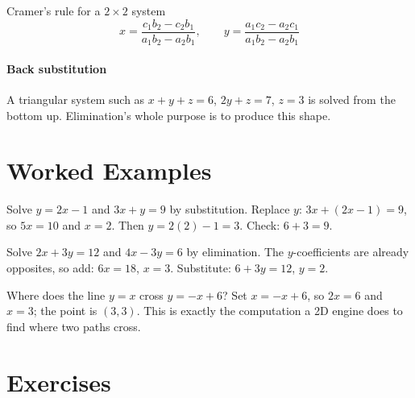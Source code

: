 \begin{keybox}{Cramer's rule for a $2 \times 2$ system}
\[
x = \frac{c_1 b_2 - c_2 b_1}{a_1 b_2 - a_2 b_1}, \qquad y = \frac{a_1 c_2 - a_2 c_1}{a_1 b_2 - a_2 b_1}
\]
\end{keybox}

\paragraph{Back substitution} A triangular system such as $x + y + z = 6$, $2y + z = 7$, $z = 3$ is solved from the bottom up. Elimination's whole purpose is to produce this shape.

\section{Worked Examples}

\begin{example}
Solve $y = 2x - 1$ and $3x + y = 9$ by substitution.
\solution Replace $y$: $3x + (2x - 1) = 9$, so $5x = 10$ and $x = 2$. Then $y = 2(2) - 1 = 3$. Check: $6 + 3 = 9$.
\end{example}

\begin{example}
Solve $2x + 3y = 12$ and $4x - 3y = 6$ by elimination.
\solution The $y$-coefficients are already opposites, so add: $6x = 18$, $x = 3$. Substitute: $6 + 3y = 12$, $y = 2$.
\end{example}

\begin{example}
Where does the line $y = x$ cross $y = -x + 6$?
\solution Set $x = -x + 6$, so $2x = 6$ and $x = 3$; the point is $(3, 3)$. This is exactly the computation a 2D engine does to find where two paths cross.
\end{example}

\section{Exercises}

